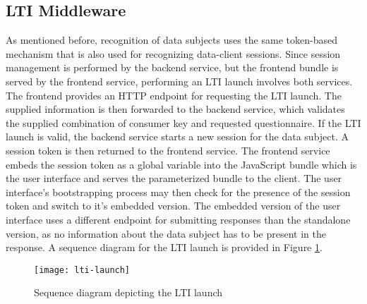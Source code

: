 \subsection{LTI Middleware}
    As mentioned before, recognition of data subjects uses the same token-based
    mechanism that is also used for recognizing data-client sessions.
    Since session management is performed by the backend service,
    but the frontend bundle is served by the frontend service, performing
    an LTI launch involves both services. The frontend provides an HTTP
    endpoint for requesting the LTI launch. The supplied information
    is then forwarded to the backend service, which validates
    the supplied combination of consumer key and requested questionnaire.
    If the LTI launch is valid, the backend service starts a new session
    for the data subject. A session token is then returned to the frontend
    service. The frontend service embeds the session token as a global
    variable into the JavaScript bundle which is the user interface and
    serves the parameterized bundle to the client.
    The user interface's bootstrapping process may then check for
    the presence of the session token and switch to it's embedded version.
    The embedded version of the user interface uses a different endpoint
    for submitting responses than the standalone version, as no information
    about the data subject has to be present in the response.
    A sequence diagram for the LTI launch is provided in Figure \ref{fig:lti-launch}.

    \begin{figure}
        \centering
        \texttt{[image: lti-launch]}
        \caption{Sequence diagram depicting the LTI launch}
        \label{fig:lti-launch}
    \end{figure}
    
